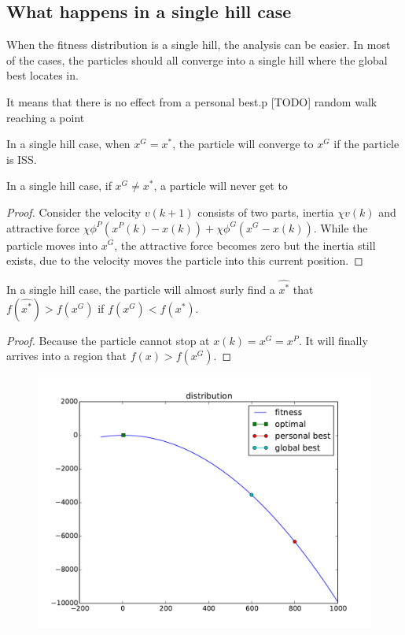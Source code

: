 \subsection{What happens in a single hill case}

When the fitness distribution is a single hill, the analysis can be easier.
In most of the cases, the particles should all converge into a single hill where the global best locates in.



It means that there is no effect from a personal best.p
[TODO] random walk reaching a point


\begin{mylem}
In a single hill case, when $ x^{G} = x^{*} $, the particle will converge to $ x^{G} $ if the particle is ISS.
\end{mylem}

\begin{mylem}
In a single hill case, if $ x^{G} \not = x^{*} $, a particle will never get to 
\begin{proof}
Consider the velocity $ v(k+1) $ consists of two parts, inertia $ \chi v(k) $ and attractive force $ \chi \phi^{P} (x^{P}(k) - x(k) ) + \chi \phi^{G} ( x^{G} - x(k) ) $.
While the particle moves into $ x^{G} $, the attractive force becomes zero but the inertia still exists, due to the velocity moves the particle into this current position.
\end{proof} 
\end{mylem}

\begin{mythm}
In a single hill case, the particle will almost surly find a $ \hat{x^{*}} $ that $ f(\hat{x^{*}}) > f(x^{G}) $ if $ f( x^{G} ) < f( x^{*}) $.
\begin{proof}
Because the particle cannot stop at $ x(k) = x^{G} = x^{P} $.
It will finally arrives into a region that $ f(x) > f(x^{G}) $.
\end{proof}
\end{mythm}

\begin{figure}[ht]
\centering
\includegraphics[width=.7\linewidth]{./simfig/case1/distribution1}
\label{fig:case1-1:distribution} 
\end{figure}

